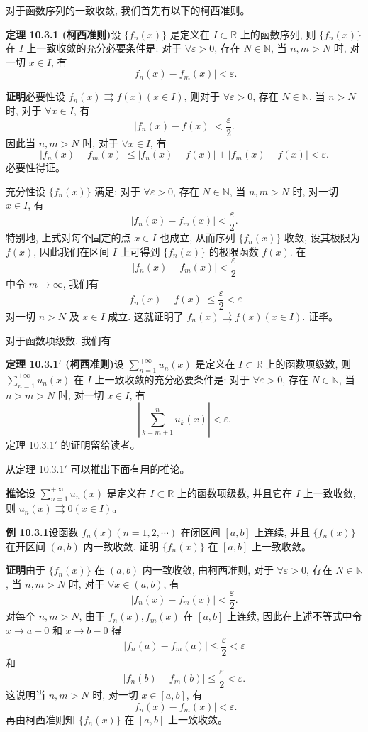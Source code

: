 \documentclass[UTF8, 12pt, fontset=fandol, oneside]{ctexart}
\begin{document}
对于函数序列的一致收敛, 我们首先有以下的柯西准则。

\noindent\textbf{定理 10.3.1 (柯西准则)}\quad 设 $\{f_n(x)\}$ 是定义在 $I\subset\mathbb R$ 上的函数序列, 则 $\{f_n(x)\}$ 在 $I$ 上一致收敛的充分必要条件是: 对于 $\forall\varepsilon>0$, 存在 $N\in\mathbb N$, 当 $n,m>N$ 时, 对一切 $x\in I$, 有
\[
  |f_n(x)-f_m(x)|<\varepsilon.
\]

\noindent\textbf{证明}\quad 必要性\quad 设 $f_n(x)\rightrightarrows f(x)(x\in I)$, 则对于 $\forall\varepsilon>0$, 存在 $N\in\mathbb N$, 当 $n>N$ 时, 对于 $\forall x\in I$, 有
\[
  |f_n(x)-f(x)|<\frac\varepsilon2.
\]
因此当 $n,m>N$ 时, 对于 $\forall x\in I$, 有
\[
  |f_n(x)-f_m(x)|\leq |f_n(x)-f(x)|+|f_m(x)-f(x)|<\varepsilon.
\]
必要性得证。

充分性\quad 设 $\{f_n(x)\}$ 满足: 对于 $\forall\varepsilon>0$, 存在 $N\in\mathbb N$, 当 $n,m>N$ 时, 对一切 $x\in I$, 有
\[
  |f_n(x)-f_m(x)|<\frac\varepsilon2.
\]
特别地, 上式对每个固定的点 $x\in I$ 也成立, 从而序列 $\{f_n(x)\}$ 收敛, 设其极限为 $f(x)$, 因此我们在区间 $I$ 上可得到 $\{f_n(x)\}$ 的极限函数 $f(x)$. 在
\[
  |f_n(x)-f_m(x)|<\frac\varepsilon2
\]
中令 $m\to\infty$, 我们有
\[
  |f_n(x)-f(x)|\leq\frac\varepsilon2<\varepsilon
\]
对一切 $n>N$ 及 $x\in I$ 成立. 这就证明了 $f_n(x)\rightrightarrows f(x)(x\in I)$. 证毕。

对于函数项级数, 我们有

\noindent\textbf{定理 10.3.1$'$ (柯西准则)}\quad 设 $\sum\limits_{n=1}^{+\infty}u_n(x)$ 是定义在 $I\subset\mathbb R$ 上的函数项级数, 则 $\sum\limits_{n=1}^{+\infty}u_n(x)$ 在 $I$ 上一致收敛的充分必要条件是: 对于 $\forall\varepsilon>0$, 存在 $N\in\mathbb N$, 当 $n>m>N$ 时, 对一切 $x\in I$, 有
\[
  \left|\sum_{k=m+1}^n u_k(x)\right|<\varepsilon.
\]
定理 10.3.1$'$ 的证明留给读者。

从定理 10.3.1$'$ 可以推出下面有用的推论。

\noindent\textbf{推论}\quad 设 $\sum\limits_{n=1}^{+\infty}u_n(x)$ 是定义在 $I\subset\mathbb R$ 上的函数项级数, 并且它在 $I$ 上一致收敛, 则 $u_n(x)\rightrightarrows0(x\in I)$。

\noindent\textbf{例 10.3.1}\quad 设函数 $f_n(x)(n=1,2,\cdots)$ 在闭区间 $[a,b]$ 上连续, 并且 $\{f_n(x)\}$ 在开区间 $(a,b)$ 内一致收敛. 证明 $\{f_n(x)\}$ 在 $[a,b]$ 上一致收敛。

\noindent\textbf{证明}\quad 由于 $\{f_n(x)\}$ 在 $(a,b)$ 内一致收敛, 由柯西准则, 对于 $\forall\varepsilon>0$, 存在 $N\in\mathbb N$, 当 $n,m>N$ 时, 对于 $\forall x\in(a,b)$, 有
\[
  |f_n(x)-f_m(x)|<\frac\varepsilon2.
\]
对每个 $n,m>N$, 由于 $f_n(x),f_m(x)$ 在 $[a,b]$ 上连续, 因此在上述不等式中令 $x\to a+0$ 和 $x\to b-0$ 得
\[
  |f_n(a)-f_m(a)|\leq\frac\varepsilon2<\varepsilon
\]
和
\[
  |f_n(b)-f_m(b)|\leq\frac\varepsilon2<\varepsilon.
\]
这说明当 $n,m>N$ 时, 对一切 $x\in[a,b]$, 有
\[
  |f_n(x)-f_m(x)|<\varepsilon.
\]
再由柯西准则知 $\{f_n(x)\}$ 在 $[a,b]$ 上一致收敛。
\end{document}
